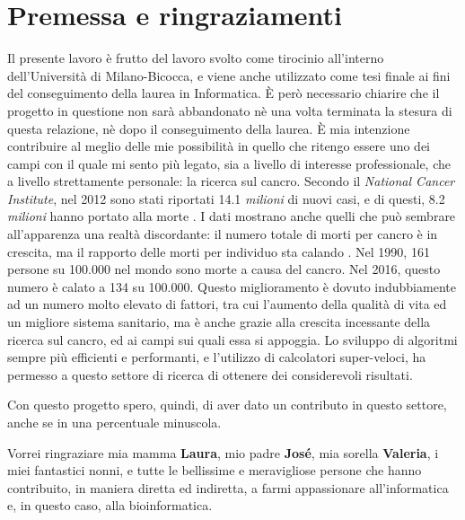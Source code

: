 \section{Premessa e ringraziamenti}

Il presente lavoro è frutto del lavoro svolto come tirocinio all'interno dell'Università di Milano-Bicocca, e viene anche utilizzato come tesi finale ai fini del conseguimento della laurea in Informatica. È però necessario chiarire che il progetto in questione non sarà abbandonato nè una volta terminata la stesura di questa relazione, nè dopo il conseguimento della laurea. È mia intenzione contribuire al meglio delle mie possibilità in quello che ritengo essere uno dei campi con il quale mi sento più legato, sia a livello di interesse professionale, che a livello strettamente personale: la ricerca sul cancro. Secondo il \textit{National Cancer Institute}, nel 2012 sono stati riportati 14.1 \textit{milioni} di nuovi casi, e di questi, 8.2 \textit{milioni} hanno portato alla morte \cite{cancerstats}. I dati mostrano anche quelli che può sembrare all'apparenza una realtà discordante: il numero totale di morti per cancro è in crescita, ma il rapporto delle morti per individuo sta calando \cite{worldindatacancer}. Nel 1990, 161 persone su 100.000 nel mondo sono morte a causa del cancro. Nel 2016, questo numero è calato a 134 su 100.000. Questo miglioramento è dovuto indubbiamente ad un numero molto elevato di fattori, tra cui l'aumento della qualità di vita ed un migliore sistema sanitario, ma è anche grazie alla crescita incessante della ricerca sul cancro, ed ai campi sui quali essa si appoggia. Lo sviluppo di algoritmi sempre più efficienti e performanti, e l'utilizzo di calcolatori super-veloci, ha permesso a questo settore di ricerca di ottenere dei considerevoli risultati.

Con questo progetto spero, quindi, di aver dato un contributo in questo settore, anche se in una percentuale minuscola.

Vorrei ringraziare mia mamma \textbf{Laura}, mio padre \textbf{José}, mia sorella \textbf{Valeria}, i miei fantastici nonni, e tutte le bellissime e meravigliose persone che hanno contribuito, in maniera diretta ed indiretta, a farmi appassionare all'informatica e, in questo caso, alla bioinformatica.